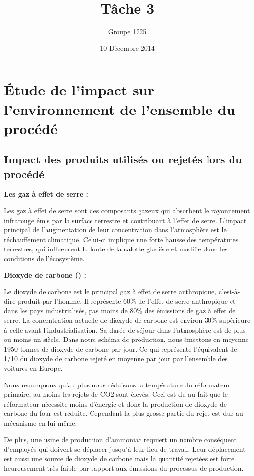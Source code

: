 \documentclass[a4paper, oneside, 12pt]{article}
\title{Tâche 3}
\author{Groupe 1225}
\date{10 Décembre 2014}
\begin{document}
\maketitle

\section*{Étude de l'impact sur l'environnement de l'ensemble du procédé}

\subsection*{Impact des produits utilisés ou rejetés lors du procédé}

\textbf{Les gaz à effet de serre :} 

Les gaz à effet de serre sont des composants gazeux qui absorbent le rayonnement infrarouge émis par la surface terrestre et contribuant à l’effet de serre. L’impact principal de l’augmentation de leur concentration dans l’atmosphère est le réchauffement climatique. Celui-ci implique une forte hausse des températures terrestres, qui influencent la fonte de la calotte glacière et modifie donc les conditions de l’écosystème. \newline


\textbf{Dioxyde de carbone () :}

Le dioxyde de carbone est le principal gaz à effet de serre anthropique, c’est-à-dire produit par l’homme. Il représente 60\% de l’effet de serre anthropique et dans les pays industrialisés, pas moins de 80\% des émissions de gaz à effet de serre. La concentration actuelle de dioxyde de carbone est environ 30\% supérieure à celle avant l’industrialisation. Sa durée de séjour dans l’atmosphère est de plus ou moins un siècle. Dans notre schéma de production, nous émettons en moyenne 1950 tonnes de dioxyde de carbone par jour. Ce qui représente l’équivalent de 1/10 du dioxyde de carbone rejeté en moyenne par jour par l’ensemble des voitures en Europe.

Nous remarquons qu’au plus nous réduisons la température du réformateur primaire, au moins les rejets de CO2 sont élevés. Ceci est du au fait que le réformateur nécessite moins d’énergie et donc la production de dioxyde de carbone du four est réduite. Cependant la plus grosse partie du rejet est due au mécanisme en lui même. 

De plus, une usine de production d’ammoniac requiert un nombre conséquent d’employés qui doivent se déplacer jusqu’à leur lieu de travail. Leur déplacement est aussi une source de dioxyde de carbone mais la quantité rejetées est forte heureusement très faible par rapport aux émissions du processus de production. \newline
\end{document}
